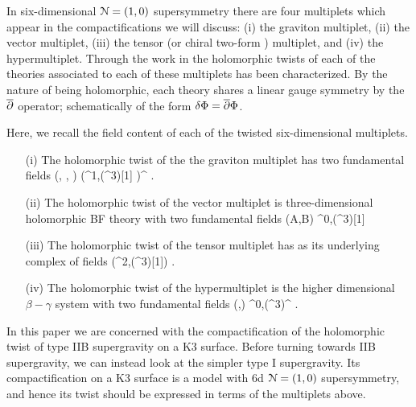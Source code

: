 \documentclass[../main.tex]{subfiles}
\begin{document}
In six-dimensional $\mathcal{N}=(1,0)$ supersymmetry there are four multiplets which appear in the compactifications we will discuss: (i) the graviton multiplet, (ii) the vector multiplet, (iii) the tensor (or chiral two-form \cite{WittenM5}) multiplet, and (iv) the hypermultiplet.
Through the work in \cite{...} the holomorphic twists of each of the theories associated to each of these multiplets has been characterized.
By the nature of being holomorphic, each theory shares a linear gauge symmetry by the $\overline{\partial}$ operator; schematically of the form $\delta \Phi = \overline{\partial} \Phi$.

Here, we recall the field content of each of the twisted six-dimensional multiplets.
\begin{itemize}
\item[(i)] The holomorphic twist of the the graviton multiplet has two fundamental fields
\beqn
(\mu, \rho, \til \alpha) \in \left(\PV^{1,\bu}(\C^3)[1] \cap \ker \div \right)^{} .
\eeqn
\item[(ii)] The holomorphic twist of the vector multiplet is three-dimensional holomorphic BF theory with two fundamental fields
\beqn
(A,B) \in \Omega^{0,\bu}(\C^3)[1]
\eeqn
\item[(iii)] The holomorphic twist of the tensor multiplet has as its underlying complex of fields
\beqn
\alpha \in \left(\Omega^{2,\bu}(\C^3)[1]\right) \cap \ker \del .
\eeqn
\item[(iv)] The holomorphic twist of the hypermultiplet is the higher dimensional $\beta-\gamma$ system with two fundamental fields
\beqn
(\gamma,\beta) \in \Omega^{0,\bu}(\C^3)^{} .
\eeqn
\end{itemize}

In this paper we are concerned with the compactification of the holomorphic twist of type IIB supergravity on a K3 surface.
Before turning towards IIB supergravity, we can instead look at the simpler type I supergravity.
Its compactification on a K3 surface is a model with 6d $\mathcal{N}=(1,0)$ supersymmetry, and hence its twist should be expressed in terms of the multiplets above.
\end{document}

